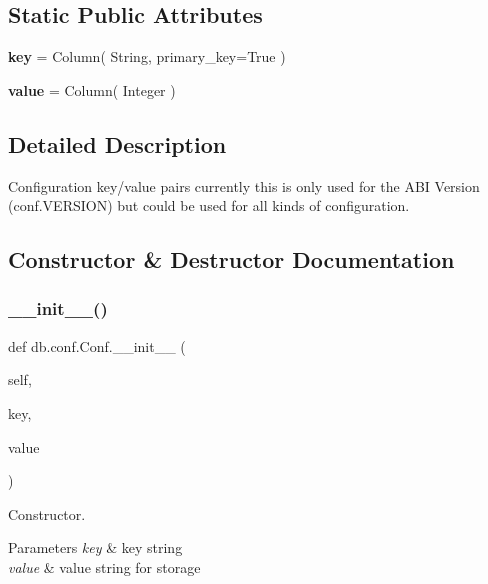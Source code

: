 \subsection*{Static Public Attributes}
\begin{DoxyCompactItemize}
\item 
\mbox{\label{classdb_1_1conf_1_1_conf_aafc780991f3dbf2b2d9cbc35c7144adb}} 
{\bfseries key} = Column( String, primary\+\_\+key=True )
\item 
\mbox{\label{classdb_1_1conf_1_1_conf_a2489f018af56086ef112ddcd3e6719d7}} 
{\bfseries value} = Column( Integer )
\end{DoxyCompactItemize}


\subsection{Detailed Description}
Configuration key/value pairs currently this is only used for the A\+BI Version (conf.\+V\+E\+R\+S\+I\+ON) but could be used for all kinds of configuration. 

\subsection{Constructor \& Destructor Documentation}
\mbox{\label{classdb_1_1conf_1_1_conf_a29c1f02ddcf9eb73316bdcde0c654a7d}} 
\subsubsection{\texorpdfstring{\+\_\+\+\_\+init\+\_\+\+\_\+()}{\_\_init\_\_()}}
{\footnotesize\ttfamily def db.\+conf.\+Conf.\+\_\+\+\_\+init\+\_\+\+\_\+ (\begin{DoxyParamCaption}\item[{}]{self,  }\item[{}]{key,  }\item[{}]{value }\end{DoxyParamCaption})}



Constructor. 


\begin{DoxyParams}{Parameters}
{\em key} & key string \\
\hline
{\em value} & value string for storage \\
\hline
\end{DoxyParams}


